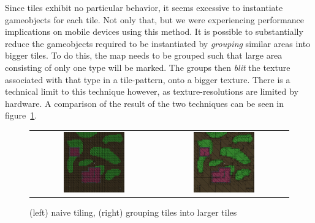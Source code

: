 Since tiles exhibit no particular behavior, it seems excessive to instantiate gameobjects for each tile. 
Not only that, but we were experiencing performance implications on mobile devices using this method.  
It is possible to substantially reduce the gameobjects required to be instantiated by \textit{grouping} similar areas into bigger tiles. 
To do this, the map needs to be grouped such that large area consisting of only one type will be marked.
The groups then \textit{blit} the texture associated with that type in a tile-pattern, onto a bigger texture.  
There is a technical limit to this technique however, as texture-resolutions are limited by hardware. 
A comparison of the result of the two techniques can be seen in figure~\ref{fig:grouped_tiling_comparison}.
\begin{figure}[H]
    \centering
    \begin{tabular}{cc}
        \includegraphics[width=0.5\textwidth]{figures/generating_levels/naive-tile.png}
        &
        \includegraphics[width=0.5\textwidth]{figures/generating_levels/grouped-tile.png}
    \end{tabular}
    \caption{(left) naive tiling, (right) grouping tiles into larger tiles}\label{fig:grouped_tiling_comparison}
\end{figure}
